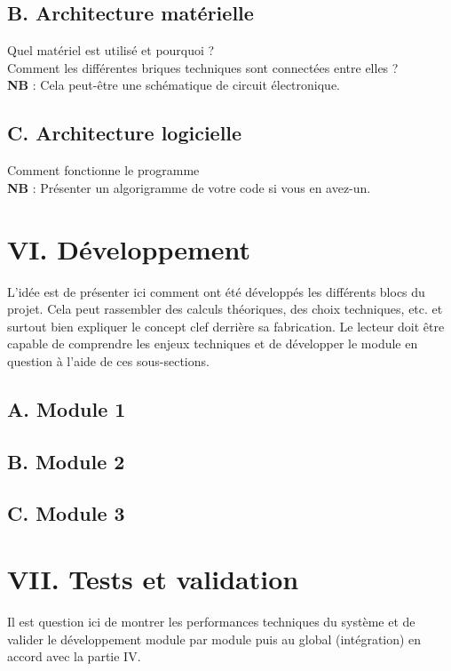 \documentclass[a4paper,11pt]{book}
\begin{document}
\vspace{3mm}
\subsection*{B. Architecture matérielle}
Quel matériel est utilisé et pourquoi ?\\
\noindent Comment les différentes briques techniques sont connectées entre elles ?\\
\noindent\textbf{NB} : Cela peut-être une schématique de circuit électronique.


\subsection*{C. Architecture logicielle}
Comment fonctionne le programme\\
\noindent \textbf{NB} : Présenter un algorigramme de votre code si vous en avez-un.

\newpage
\section*{VI. Développement}
L’idée est de présenter ici comment ont été développés les différents blocs du projet. Cela peut rassembler des calculs théoriques, des choix techniques, etc. et surtout bien expliquer le concept clef derrière sa fabrication.
Le lecteur doit être capable de comprendre les enjeux techniques et de développer le module en question à l’aide de ces sous-sections.

\subsection*{A. Module 1}
\subsection*{B. Module 2}
\subsection*{C. Module 3}


\newpage
\section*{VII. Tests et validation}

\vspace{2mm}
\noindent Il est question ici de montrer les performances techniques du système et de valider le développement module par module puis au global (intégration) en accord avec la partie IV.
\end{document}
